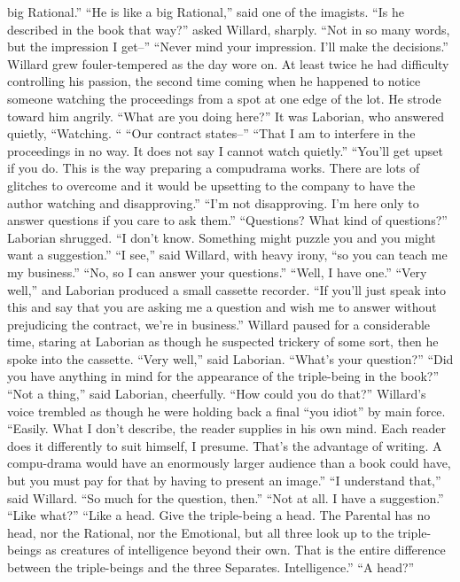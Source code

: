 \documentclass[a4paper,12pt]{article}
\begin{document}
big Rational.”
“He is like a big Rational,” said one of the imagists.
“Is he described in the book that way?” asked Willard, sharply.
“Not in so many words, but the impression I get--”
“Never mind your impression. I’ll make the decisions.”
Willard grew fouler-tempered as the day wore on. At least twice he had difficulty controlling his
passion, the second time coming when he happened to notice someone watching the proceedings from a
spot at one edge of the lot.
He strode toward him angrily. “What are you doing here?”
It was Laborian, who answered quietly, “Watching. “
“Our contract states--”
“That I am to interfere in the proceedings in no way. It does not say I cannot watch quietly.”
“You’ll get upset if you do. This is the way preparing a compudrama works. There are lots of
glitches to overcome and it would be upsetting to the company to have the author watching and
disapproving.”
“I’m not disapproving. I’m here only to answer questions if you care to ask them.”
“Questions? What kind of questions?”
Laborian shrugged. “I don’t know. Something might puzzle you and you might want a
suggestion.”
“I see,” said Willard, with heavy irony, “so you can teach me my business.”
“No, so I can answer your questions.”
“Well, I have one.”
“Very well,” and Laborian produced a small cassette recorder. “If you’ll just speak into this and
say that you are asking me a question and wish me to answer without prejudicing the contract, we’re in
business.”
Willard paused for a considerable time, staring at Laborian as though he suspected trickery of
some sort, then he spoke into the cassette.
“Very well,” said Laborian. “What’s your question?”
“Did you have anything in mind for the appearance of the triple-being in the book?”
“Not a thing,” said Laborian, cheerfully.
“How could you do that?” Willard’s voice trembled as though he were holding back a final “you
idiot” by main force.
“Easily. What I don’t describe, the reader supplies in his own mind. Each reader does it differently
to suit himself, I presume. That’s the advantage of writing. A compu-drama would have an enormously
larger audience than a book could have, but you must pay for that by having to present an image.”
“I understand that,” said Willard. “So much for the question, then.”
“Not at all. I have a suggestion.”
“Like what?”
“Like a head. Give the triple-being a head. The Parental has no head, nor the Rational, nor the
Emotional, but all three look up to the triple-beings as creatures of intelligence beyond their own. That is
the entire difference between the triple-beings and the three Separates. Intelligence.”
“A head?”
\end{document}
